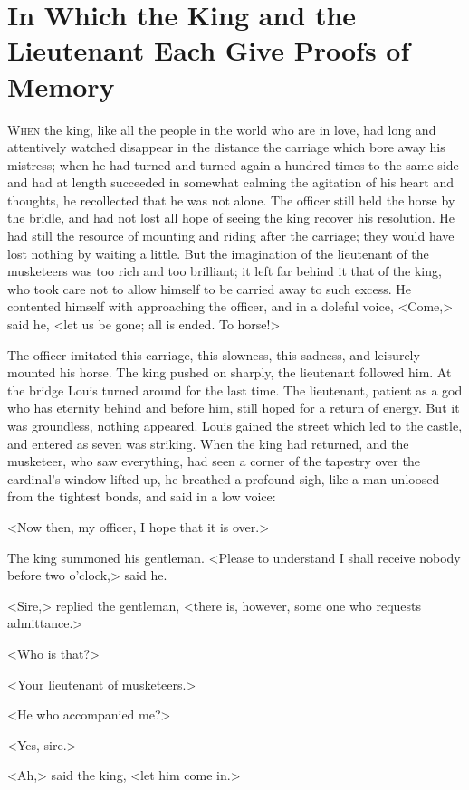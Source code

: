 \chapter{In Which the King and the Lieutenant Each Give Proofs of Memory}

\lettrine{W}{hen} the king, like all the people in the world who are in love, had long and attentively watched disappear in the distance the carriage which bore away his mistress; when he had turned and turned again a hundred times to the same side and had at length succeeded in somewhat calming the agitation of his heart and thoughts, he recollected that he was not alone. The officer still held the horse by the bridle, and had not lost all hope of seeing the king recover his resolution. He had still the resource of mounting and riding after the carriage; they would have lost nothing by waiting a little. But the imagination of the lieutenant of the musketeers was too rich and too brilliant; it left far behind it that of the king, who took care not to allow himself to be carried away to such excess. He contented himself with approaching the officer, and in a doleful voice, <Come,> said he, <let us be gone; all is ended. To horse!>

The officer imitated this carriage, this slowness, this sadness, and leisurely mounted his horse. The king pushed on sharply, the lieutenant followed him. At the bridge Louis turned around for the last time. The lieutenant, patient as a god who has eternity behind and before him, still hoped for a return of energy. But it was groundless, nothing appeared. Louis gained the street which led to the castle, and entered as seven was striking. When the king had returned, and the musketeer, who saw everything, had seen a corner of the tapestry over the cardinal's window lifted up, he breathed a profound sigh, like a man unloosed from the tightest bonds, and said in a low voice:

<Now then, my officer, I hope that it is over.>

The king summoned his gentleman. <Please to understand I shall receive nobody before two o'clock,> said he.

<Sire,> replied the gentleman, <there is, however, some one who requests admittance.>

<Who is that?>

<Your lieutenant of musketeers.>

<He who accompanied me?>

<Yes, sire.>

<Ah,> said the king, <let him come in.>

